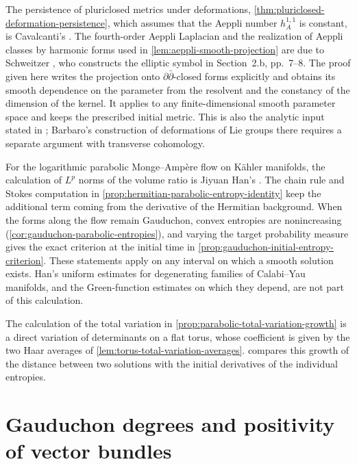 The persistence of pluriclosed metrics under deformations, \cref{thm:pluriclosed-deformation-persistence}, which assumes that the Aeppli number $h_A^{1,1}$ is constant, is Cavalcanti's \cite[v5, Theorem~8.11, Section~8.3, pp.~41--42]{CavSKT13}. The fourth-order Aeppli Laplacian and the realization of Aeppli classes by harmonic forms used in \cref{lem:aeppli-smooth-projection} are due to Schweitzer \cite[v1, Section~2.c, pp.~9--10]{SchAeppli07}, who constructs the elliptic symbol in Section~2.b, pp.~7--8. The proof given here writes the projection onto $\partial\bar\partial$-closed forms explicitly and obtains its smooth dependence on the parameter from the resolvent and the constancy of the dimension of the kernel. It applies to any finite-dimensional smooth parameter space and keeps the prescribed initial metric. This is also the analytic input stated in \cite[v1, Theorem~2.1, p.~7]{BarDef26}; Barbaro's construction of deformations of Lie groups there requires a separate argument with transverse cohomology.

For the logarithmic parabolic Monge--Amp\`ere flow on K\"ahler manifolds, the calculation of $L^p$ norms of the volume ratio is Jiyuan Han's \cite[v1, Lemma~3.2, pp.~13--14]{HanParabolic26}. The chain rule and Stokes computation in \cref{prop:hermitian-parabolic-entropy-identity} keep the additional term coming from the derivative of the Hermitian background. When the forms along the flow remain Gauduchon, convex entropies are nonincreasing (\cref{cor:gauduchon-parabolic-entropies}), and varying the target probability measure gives the exact criterion at the initial time in \cref{prop:gauduchon-initial-entropy-criterion}. These statements apply on any interval on which a smooth solution exists. Han's uniform estimates for degenerating families of Calabi--Yau manifolds, and the Green-function estimates on which they depend, are not part of this calculation.

The calculation of the total variation in \cref{prop:parabolic-total-variation-growth} is a direct variation of determinants on a flat torus, whose coefficient is given by the two Haar averages of \cref{lem:torus-total-variation-averages}.  compares this growth of the distance between two solutions with the initial derivatives of the individual entropies.

\section{Gauduchon degrees and positivity of vector bundles}
\label{sec:history-bundle-positivity}

